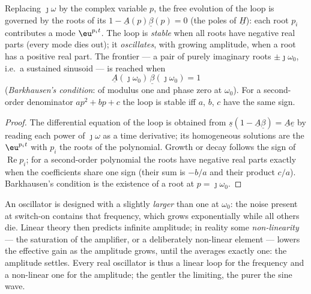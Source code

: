 \begin{theorem}\label{thm:b2:feedback-oscillators:stability}
Replacing $\jmath\omega$ by the complex variable $p$, the free evolution of
the loop is governed by the roots of its \emph{}
$1 - \underline A(p)\underline\beta(p) = 0$ (the poles of $\underline H$): each root
$p_i$ contributes a mode $\eu^{p_it}$. The loop is \emph{stable} when all
roots have negative real parts (every mode dies out); it
\emph{oscillates}, with growing amplitude, when a root has a positive
real part. The frontier --- a pair of purely imaginary roots $\pm\jmath
\omega_0$, i.e.\ a sustained sinusoid --- is reached when
\[
\underline A(\jmath\omega_0)\,\underline\beta(\jmath\omega_0) = 1
\]
(\emph{Barkhausen's condition}:  of modulus one and phase
zero at $\omega_0$). For a second-order denominator $ap^2 + bp + c$ the
loop is stable iff $a$, $b$, $c$ have the same sign.
\end{theorem}

\begin{proof}
The differential equation of the loop is obtained from $\underline s(1 -
\underline A\underline\beta) = \underline A\underline e$ by reading each power of $\jmath\omega$
as a time derivative; its homogeneous solutions are the $\eu^{p_it}$
with $p_i$ the roots of the polynomial. Growth or decay follows the
sign of $\operatorname{Re}p_i$; for a second-order polynomial the roots
have negative real parts exactly when the coefficients share one sign
(their sum is $-b/a$ and their product $c/a$). Barkhausen's condition
is the existence of a root at $p = \jmath\omega_0$.
\end{proof}

\begin{remark}\label{rem:b2:feedback-oscillators:start}
An oscillator is designed with a  slightly \emph{larger} than
one at $\omega_0$: the noise present at switch-on contains that frequency,
which grows exponentially while all others die. Linear theory then
predicts infinite amplitude; in reality some \emph{non-linearity} ---
the saturation of the amplifier, or a deliberately non-linear
element --- lowers the effective gain as the amplitude grows, until the
 averages exactly one: the amplitude settles. Every real
oscillator is thus a linear loop for the frequency and a non-linear
one for the amplitude; the gentler the limiting, the purer the
sine wave.
\end{remark}

